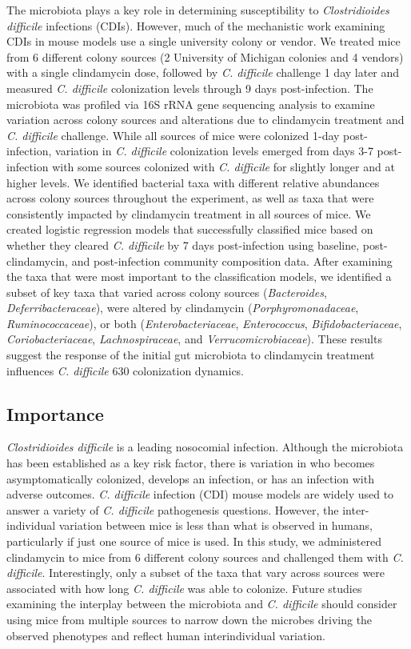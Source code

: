 \documentclass[11pt,]{article}
\begin{document}
The microbiota plays a key role in determining susceptibility to
\emph{Clostridioides difficile} infections (CDIs). However, much of the
mechanistic work examining CDIs in mouse models use a single university
colony or vendor. We treated mice from 6 different colony sources (2
University of Michigan colonies and 4 vendors) with a single clindamycin
dose, followed by \emph{C. difficile} challenge 1 day later and measured
\emph{C. difficile} colonization levels through 9 days post-infection.
The microbiota was profiled via 16S rRNA gene sequencing analysis to
examine variation across colony sources and alterations due to
clindamycin treatment and \emph{C. difficile} challenge. While all
sources of mice were colonized 1-day post-infection, variation in
\emph{C. difficile} colonization levels emerged from days 3-7
post-infection with some sources colonized with \emph{C. difficile} for
slightly longer and at higher levels. We identified bacterial taxa with
different relative abundances across colony sources throughout the
experiment, as well as taxa that were consistently impacted by
clindamycin treatment in all sources of mice. We created logistic
regression models that successfully classified mice based on whether
they cleared \emph{C. difficile} by 7 days post-infection using
baseline, post-clindamycin, and post-infection community composition
data. After examining the taxa that were most important to the
classification models, we identified a subset of key taxa that varied
across colony sources (\emph{Bacteroides}, \emph{Deferribacteraceae}),
were altered by clindamycin (\emph{Porphyromonadaceae},
\emph{Ruminococcaceae}), or both (\emph{Enterobacteriaceae},
\emph{Enterococcus}, \emph{Bifidobacteriaceae},
\emph{Coriobacteriaceae}, \emph{Lachnospiraceae}, and
\emph{Verrucomicrobiaceae}). These results suggest the response of the
initial gut microbiota to clindamycin treatment influences \emph{C.
difficile} 630 colonization dynamics.

\subsection{Importance}\label{importance}

\emph{Clostridioides difficile} is a leading nosocomial infection.
Although the microbiota has been established as a key risk factor, there
is variation in who becomes asymptomatically colonized, develops an
infection, or has an infection with adverse outcomes. \emph{C.
difficile} infection (CDI) mouse models are widely used to answer a
variety of \emph{C. difficile} pathogenesis questions. However, the
inter-individual variation between mice is less than what is observed in
humans, particularly if just one source of mice is used. In this study,
we administered clindamycin to mice from 6 different colony sources and
challenged them with \emph{C. difficile}. Interestingly, only a subset
of the taxa that vary across sources were associated with how long
\emph{C. difficile} was able to colonize. Future studies examining the
interplay between the microbiota and \emph{C. difficile} should consider
using mice from multiple sources to narrow down the microbes driving the
observed phenotypes and reflect human interindividual variation.
\end{document}
